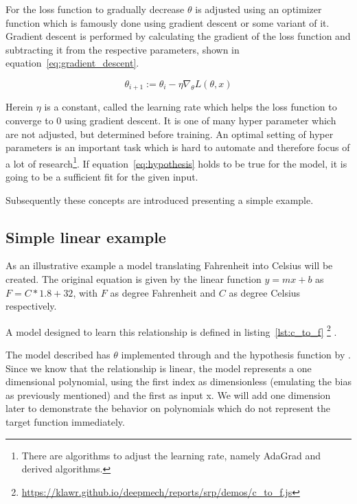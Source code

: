 For the loss function to gradually decrease $\theta$ is adjusted using an optimizer function which is famously done using gradient descent or some variant of it.
Gradient descent is performed by calculating the gradient of the loss function and subtracting it from the respective parameters, shown in equation~\eqref{eq:gradient_descent}.

\begin{equation} \label{eq:gradient_descent}
    \theta_{i+1} := \theta_i - \eta \nabla_\theta L(\theta, x)
\end{equation}

Herein $\eta$ is a constant, called the learning rate which helps the loss function to converge to 0 using gradient descent.
It is one of many hyper parameter which are not adjusted, but determined before training. An optimal setting of hyper parameters is an important task which is hard to automate and therefore focus of a lot of research\footnote{There are algorithms to adjust the learning rate, namely AdaGrad\cite{Duchi2010} and derived algorithms.}.
If equation~\eqref{eq:hypothesis} holds to be true for the model, it is going to be a sufficient fit for the given input.

Subsequently these concepts are introduced presenting a simple example.

\subsection{Simple linear example} \label{ch:simple_linear_example}

As an illustrative example a model translating Fahrenheit into Celsius will be created.
The original equation is given by the linear function $y = mx + b$ as $F = C * 1.8 + 32$, with $F$ as degree Fahrenheit and $C$ as degree Celsius respectively.

A model designed to learn this relationship is defined in listing~\ref{lst:c_to_f} \footnote{\url{https://klawr.github.io/deepmech/reports/srp/demos/c\_to\_f.js}} .



The model described has $\theta$ implemented through  and the hypothesis function by .
Since we know that the relationship is linear, the model represents a one dimensional polynomial, using the first index as dimensionless (emulating the bias as previously mentioned) and the first as input x.
We will add one dimension later to demonstrate the behavior on polynomials which do not represent the target function immediately.

